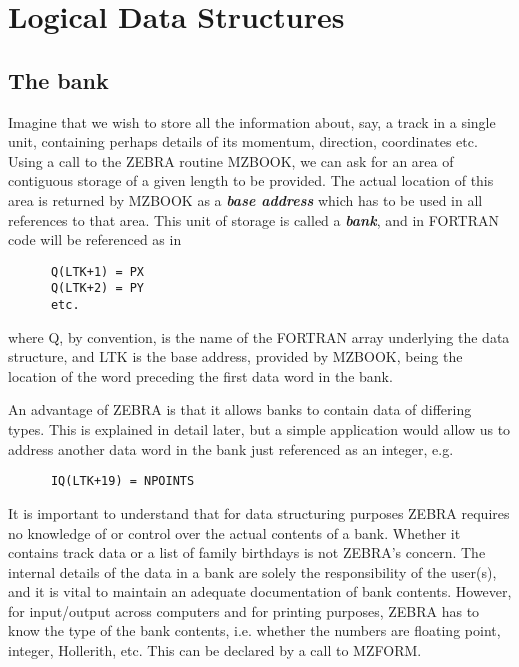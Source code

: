 \section{Logical Data Structures}
\subsection{The bank}
\par
Imagine that we wish to store all the information about, say, a track in
a single unit, containing perhaps details of its momentum, direction,
coordinates etc. Using a call to the ZEBRA routine MZBOOK, we can ask
for an area of contiguous storage of a given length to be provided. The
actual location of this area is returned by MZBOOK as a
{\bf\it base address} which has to be used in all references to that area.
This unit of storage is called a
{\bf\it bank}, and in FORTRAN code will be referenced as in
\begin{verbatim}
      Q(LTK+1) = PX
      Q(LTK+2) = PY
      etc.
\end{verbatim}
where Q, by convention, is the name of the FORTRAN array underlying the
data structure, and LTK is the base address,
provided by MZBOOK, being the location of the word
preceding the first data word in the bank.
\par An advantage of ZEBRA is that it allows banks to contain data of
differing types. This is explained in detail later, but a simple
application would allow us to address another data word in the bank just
referenced as an integer, e.g.
\begin{verbatim}
      IQ(LTK+19) = NPOINTS
\end{verbatim}
It is important to understand that for data structuring purposes
ZEBRA requires no knowledge of or control
over the actual contents of a bank. Whether it contains track data or a
list of family birthdays is not ZEBRA's concern. The internal details of
the data in a bank are solely the responsibility of the user(s), and it is
vital to maintain an adequate documentation of bank contents.
However, for input/output across computers and for printing
purposes, ZEBRA has to know the type of the bank contents, i.e. whether
the numbers are floating point, integer, Hollerith, etc.
This can be declared by a call to MZFORM.
